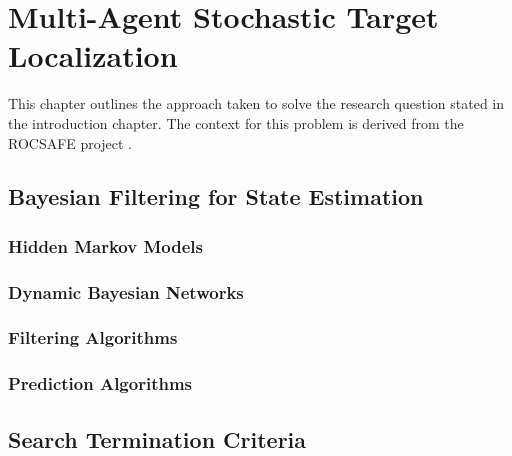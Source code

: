 \chapter{Multi-Agent Stochastic Target Localization}
\placeholder{}
This chapter outlines the approach taken to solve the research question stated in the introduction chapter. The context for this problem is derived from the ROCSAFE project \cite{rocsafeNUIG}. 

\section{Bayesian Filtering for State Estimation}

\subsection{Hidden Markov Models}


\subsection{Dynamic Bayesian Networks}


\subsection{Filtering Algorithms}


\subsection{Prediction Algorithms}




\section{Search Termination Criteria}

